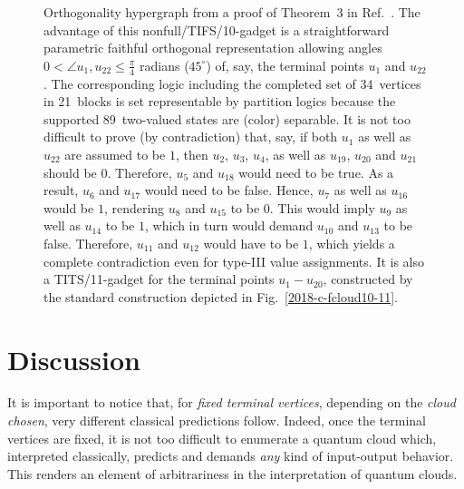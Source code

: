 \documentclass[%
  reprint,
  twocolumn,
 showpacs,
 showkeys,
 preprintnumbers,
 amsmath,amssymb,
 aps,
  prl,
  longbibliography,
 ]{revtex4-1}
\begin{document}
\begin{figure}
\begin{center}
\begin{tikzpicture}  [scale=0.5,rotate=0]
\end{tikzpicture}
\end{center}
\caption{\label{2019-c-HH10}
Orthogonality hypergraph from a proof of
Theorem~3 in Ref.~\cite{Ramanathan-18}.
The advantage of this nonfull/TIFS/10-gadget
is a straightforward parametric faithful orthogonal representation allowing angles
$0< \angle u_1,u_{22} \le \frac{\pi}{4}$ radians ($45^\circ$)
of, say, the terminal points $u_1$ and $u_{22}$.
The corresponding logic including the completed set of
34~vertices in
21~blocks is set representable by partition logics because the supported 89~two-valued
states are (color) separable.
It is not too difficult to prove (by contradiction) that, say,
if both $u_1$ as well as $u_{22}$
are assumed to be $1$, then
$u_2$,
$u_3$,
$u_4$,
as well as
$u_{19}$,
$u_{20}$
and $u_{21}$
should be $0$.
Therefore,
$u_5$ and
$u_{18}$
would need to be true.
As a result,
$u_{6}$ and
$u_{17}$ would need to be false.
Hence,
$u_{7}$ as well as
$u_{16}$ would be $1$,
rendering
$u_{8}$ and
$u_{15}$ to be $0$.
This would imply
$u_{9}$ as well as
$u_{14}$ to be $1$,
which in turn would demand
$u_{10}$ and
$u_{13}$ to be false.
Therefore,
$u_{11}$ and
$u_{12}$ would have to be $1$, which yields a complete contradiction even for type-III
value assignments.
It is also a TITS/11-gadget for the terminal points
$u_1-u_{20}$, constructed by the standard construction depicted in Fig.~\ref{2018-c-fcloud10-11}.
}
\end{figure}

\section{Discussion}

It is important to notice that, for {\em fixed terminal vertices}, depending on the {\em cloud chosen}, very different classical predictions follow.
Indeed, once the terminal vertices are fixed, it is not too difficult to enumerate a quantum cloud which,
interpreted classically, predicts and demands {\em any} kind of input-output behavior.
This renders an element of arbitrariness in the interpretation of quantum clouds.
\end{document}
